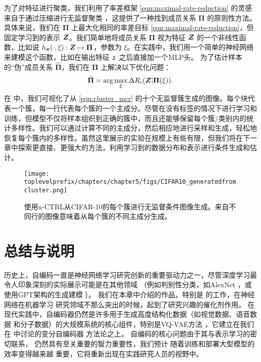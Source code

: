 \documentclass[../../book-main_zh.tex]{subfiles}
\begin{document}
为了对特征进行聚类，我们利用了率差框架 \eqref{eqn:maximal-rate-reduction} 的灵感来自于通过压缩进行无监督聚类 \cite{ma2007segmentation}，这提供了一种找到成员关系 $\bm \Pi$ 的原则性方法。
具体来说，我们在 $\bm \Pi$ 上最大化相同的率差目标 \eqref{eqn:maximal-rate-reduction}，但固定学习到的表示 $\bm{Z}$。我们简单地将成员关系 $\bm \Pi$ 视为特征 $\bm{Z}$ 的一个非线性函数，比如说 $h_{\bm \pi}(\cdot,\xi):\bm{Z} \mapsto \bm \Pi$，参数为 $\xi$。在实践中，我们用一个简单的神经网络来建模这个函数，比如在输出特征 $\bm{z}$ 之后直接加一个MLP头。
为了估计样本的“伪”成员关系 $\hat{\bm \Pi}$，我们在 $\bm \Pi$ 上解决以下优化问题：
\begin{align}
    \hat{\bm \Pi} = \arg\max_{\xi} \Delta R_\epsilon(\bm{Z}| \bm \Pi(\xi)).
\label{eqn:cluster_mcr}
\end{align}
在  中，我们可视化了从 \eqref{eqn:cluster_mcr} 的十个无监督簇生成的图像。每个块代表一个簇，每一行代表每个簇的一个主成分。尽管在没有标签的情况下进行学习和训练，但模型不仅将样本组织到正确的簇中，而且还能够保留每个簇/类别内的统计多样性。我们可以通过计算不同的主成分，然后相应地进行采样和生成，轻松地恢复每个簇内的多样性。虽然这里展示的实验在规模上有些有限，但我们将在下一章中探索更直接、更强大的方法，利用学习到的数据分布和表示进行条件生成和估计。
\begin{figure}[t]
    \footnotesize
    \centering
    \texttt{[image: \\toplevelprefix/chapters/chapter5/figs/CIFAR10\_generatedfromcluster.png]}
    \caption{\small 使用u-CTRL从CIFAR-10的每个簇进行无监督条件图像生成。来自不同行的图像意味着从每个簇的不同主成分生成。}
    \label{fig:vis_clustering}
\end{figure}





\section{总结与说明}
历史上，自编码一直是神经网络学习研究创新的重要驱动力之一，尽管深度学习最令人印象深刻的实际展示可能是在其他领域
（例如判别性分类，如AlexNet
\cite{krizhevsky2012imagenet}，或使用GPT架构的生成建模
\cite{brown2020language}）。
我们在本章中介绍的作品，特别是
\cite{Hinton504} 的工作，在神经网络在机器学习
研究领域不那么突出的时候，起到了研究兴趣的催化剂作用。
在现代实践中，自编码器仍然是许多用于生成高度结构化数据（如视觉数据、语音数据
和分子数据）的大规模系统的核心组件，特别是VQ-VAE方法
\cite{van-den-Oord2017-jr}，它建立在我们
在  中讨论的变分自编码器
方法论之上。
自编码的核心问题由于其与表示学习的密切联系，
仍然具有至关重要的智力重要性，我们预计
随着训练和部署大型模型的效率变得越来越
重要，它将重新出现在实践研究人员的视野中。
\end{document}
